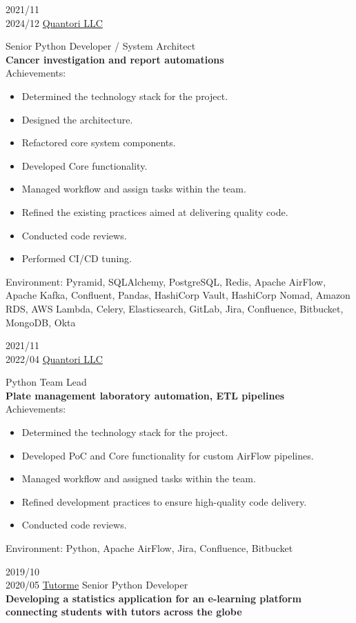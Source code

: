 \begin{entrylist}
\entry
{2021/11\\2024/12}
{\href{https://quantori.com}{Quantori LLC}}
{}
{Senior Python Developer / System Architect\\
\textbf{Cancer investigation and report automations}\\
Achievements:
\begin{itemize}
\item Determined the technology stack for the project.
\item Designed the architecture.
\item Refactored core system components.
\item Developed Core functionality.
\item Managed workflow and assign tasks within the team.
\item Refined the existing practices aimed at delivering quality code.
\item Conducted code reviews.
\item Performed CI/CD tuning.
\end{itemize}
Environment: Pyramid, SQLAlchemy, PostgreSQL, Redis, Apache AirFlow, Apache Kafka, Confluent, Pandas, HashiCorp Vault, HashiCorp Nomad, Amazon RDS, AWS Lambda, Celery, Elasticsearch, GitLab, Jira, Confluence, Bitbucket, MongoDB, Okta}
\entry
{2021/11\\2022/04}
{\href{https://quantori.com}{Quantori LLC}}
{}
{Python Team Lead\\
\textbf{Plate management laboratory automation, ETL pipelines}\\
Achievements:
\begin{itemize}
\item Determined the technology stack for the project.
\item Developed PoC and Core functionality for custom AirFlow pipelines.
\item Managed workflow and assigned tasks within the team.
\item Refined development practices to ensure high-quality code delivery.
\item Conducted code reviews.
\end{itemize}
Environment: Python, Apache AirFlow, Jira, Confluence, Bitbucket}
\entry
{2019/10\\2020/05}
{\href{https://tutorme.com}{Tutorme}}
{}
{Senior Python Developer\\
\textbf{Developing a statistics application for an e-learning platform connecting students with tutors across the globe}\\
}
\end{entrylist}

